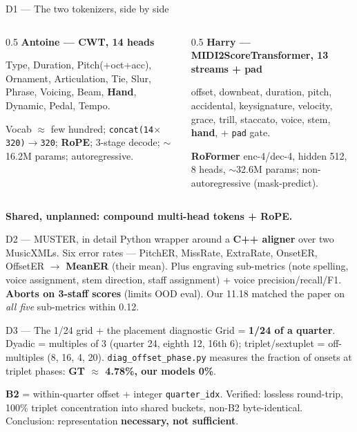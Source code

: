 \documentclass[aspectratio=169,11pt]{beamer}
\begin{document}
\begin{frame}{D1 --- The two tokenizers, side by side}
  \scriptsize
  \begin{columns}[T]
    \begin{column}{0.5\textwidth}
      \textbf{Antoine --- CWT, 14 heads}\par
      Type, Duration, Pitch(+oct+acc), Ornament, Articulation, Tie, Slur, Phrase, Voicing, Beam, \textbf{Hand}, Dynamic, Pedal, Tempo.\par\smallskip
      Vocab $\approx$ few hundred; \texttt{concat(14$\times$320)$\to$320}; \textbf{RoPE}; 3-stage decode; $\sim$16.2M params; autoregressive.
    \end{column}
    \begin{column}{0.5\textwidth}
      \textbf{Harry --- MIDI2ScoreTransformer, 13 streams + pad}\par
      offset, downbeat, duration, pitch, accidental, keysignature, velocity, grace, trill, staccato, voice, stem, \textbf{hand}, + \texttt{pad} gate.\par\smallskip
      \textbf{RoFormer} enc-4/dec-4, hidden 512, 8 heads, $\sim$32.6M params; non-autoregressive (mask-predict).
    \end{column}
  \end{columns}
  \vspace{0.5em}
  \begin{center}\color{labblue}\textbf{Shared, unplanned: compound multi-head tokens + RoPE.}\end{center}
\end{frame}

\begin{frame}{D2 --- MUSTER, in detail}
  \footnotesize
  Python wrapper around a \textbf{C++ aligner} over two MusicXMLs. Six error rates --- PitchER, MissRate, ExtraRate, OnsetER, OffsetER $\to$ \textbf{MeanER} (their mean). Plus engraving sub-metrics (note spelling, voice assignment, stem direction, staff assignment) + voice precision/recall/F1. \textbf{Aborts on 3-staff scores} (limits OOD eval). Our 11.18 matched the paper on \emph{all five} sub-metrics within 0.12.
\end{frame}

\begin{frame}{D3 --- The 1/24 grid + the placement diagnostic}
  \footnotesize
  Grid = \textbf{1/24 of a quarter}. Dyadic = multiples of 3 (quarter 24, eighth 12, 16th 6); triplet/sextuplet = off-multiples (8, 16, 4, 20). \texttt{diag\_offset\_phase.py} measures the fraction of onsets at triplet phases: \textbf{GT $\approx$ 4.78\%, our models 0\%}.\par\smallskip
  \textbf{B2} = within-quarter offset + integer \texttt{quarter\_idx}. Verified: lossless round-trip, 100\% triplet concentration into shared buckets, non-B2 byte-identical. Conclusion: representation \textbf{necessary, not sufficient}.
\end{frame}
\end{document}
